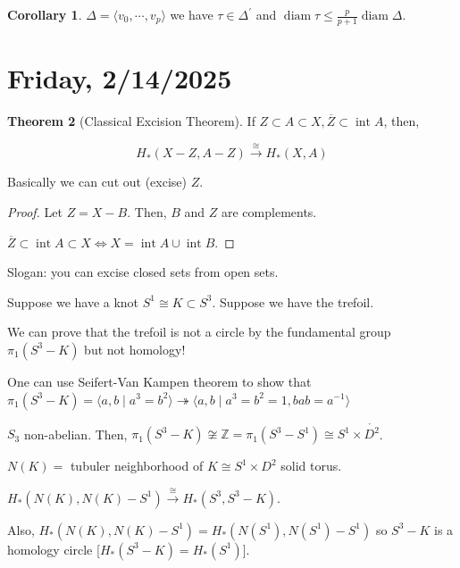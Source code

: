 \documentclass{article}
\theoremstyle{definition}
\newtheorem{theorem}{Theorem}
\newtheorem{corollary}[theorem]{Corollary}
\begin{document}
    \begin{corollary}
        \(\Delta = \langle v_0, \cdots , v_p \rangle\) we have \(\tau \in \Delta^{\prime}\) and \(\operatorname{diam} \tau \leq \frac{p}{p+1} \operatorname{diam} \Delta\).
    \end{corollary}

    \section*{Friday, 2/14/2025}
    
    \begin{theorem}
        [Classical Excision Theorem] If \(Z \subset A \subset X, \overline{Z} \subset \operatorname{int} A\), then,

        \[
            H_{\ast} (X - Z, A - Z) \xrightarrow{\cong} H_{\ast} (X,A)
        \]

        Basically we can cut out (excise) \(Z\).
    \end{theorem}

    \begin{proof}
        Let \(Z = X - B\). Then, \(B\) and \(Z\) are complements.

        \(\overline{Z} \subset \operatorname{int} A \subset X \iff X = \operatorname{int} A \cup \operatorname{int} B\).
    \end{proof}

    Slogan: you can excise closed sets from open sets.

    Suppose we have a knot \(S^1 \cong K \subset S^3\). Suppose we have the trefoil.


    We can prove that the trefoil is not a circle by the fundamental group \(\pi_1(S^3 - K)\) but not homology!
    
    One can use Seifert-Van Kampen theorem to show that \(\pi_1(S^3 - K) = \langle a,b \mid a^3 = b^2 \rangle \twoheadrightarrow \langle a, b \mid a^3 = b^2 = 1, b a b = a ^{-1} \rangle \)
    
    \(S_3\) non-abelian. Then, \(\pi_1(S^3 - K) \not\cong \mathbb{Z} = \pi_1(S^3 - S^1) \cong S^1 \times\mathring{D^2}\).

    \(N(K) =\) tubuler neighborhood of \(K \cong S^1 \times D^2\) solid torus.

    \(H_{\ast} (N(K), N(K)-S^1) \xrightarrow{\cong} H_{\ast} (S^3, S^3 - K)\).
    
    Also, \(H_{\ast} (N(K),N(K)-S^1)=H_{\ast} (N(S^1),N(S^1)-S^1)\) so \(S^3 - K\) is a homology circle [\(H_{\ast} (S^3 - K) = H_{\ast} (S^1)\)].
\end{document}
